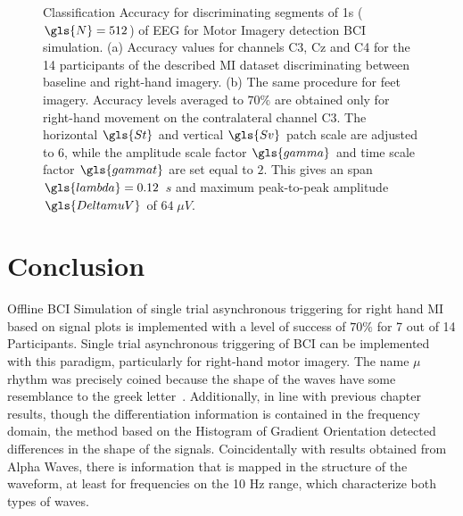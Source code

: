    
\begin{figure}[h!]
\centering
{}
\caption[Motor Imagery Accuracy]{Classification Accuracy for discriminating segments of 1s ($\gls{N} = 512$) of EEG for Motor Imagery detection BCI simulation. (a) Accuracy values for channels C3, Cz and C4 for the 14 participants of the described MI dataset discriminating between baseline and right-hand imagery. (b) The same procedure for feet imagery. Accuracy levels averaged to $70\%$ are obtained only for right-hand movement on the contralateral channel C3. The horizontal $\gls{St}$ and vertical $\gls{Sv}$ patch scale are adjusted to $6$, while the amplitude scale factor $\gls{gamma}$ and time scale factor $\gls{gammat}$ are set equal to $2$.  This gives an span $\gls{lambda} = 0.12$  $\si{s}$ and maximum peak-to-peak amplitude $\gls{DeltamuV}$ of $64 \; \mu V$.  }
\label{fig:miresults}
\end{figure}
   
\section{Conclusion}

Offline BCI Simulation of single trial asynchronous triggering for right hand MI based on signal plots is implemented with a level of success of $70\%$ for 7 out of 14 Participants. Single trial asynchronous triggering of BCI can be implemented with this paradigm, particularly for right-hand motor imagery. The name $\mu$ rhythm was precisely coined because the shape of the waves have some resemblance to the greek letter~\cite{Cole2017}.   Additionally, in line with previous chapter results, though the differentiation information is contained in the frequency domain, the method based on the Histogram of Gradient Orientation detected differences in the shape of the signals.  Coincidentally with results obtained from Alpha Waves, there is information that is mapped in the structure of the waveform, at least for frequencies on the 10 Hz range, which characterize both types of waves.



